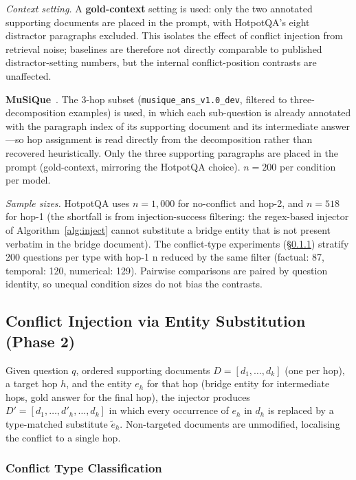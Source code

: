 \textit{Context setting.} A \textbf{gold-context} setting is used: only the two annotated supporting documents are placed in the prompt, with HotpotQA's eight distractor paragraphs excluded. This isolates the effect of conflict injection from retrieval noise; baselines are therefore not directly comparable to published distractor-setting numbers, but the internal conflict-position contrasts are unaffected.

\textbf{MuSiQue}~\citep{trivedi2022musique}. The 3-hop subset (\texttt{musique\_ans\_v1.0\_dev}, filtered to three-decomposition examples) is used, in which each sub-question is already annotated with the paragraph index of its supporting document and its intermediate answer---so hop assignment is read directly from the decomposition rather than recovered heuristically. Only the three supporting paragraphs are placed in the prompt (gold-context, mirroring the HotpotQA choice). $n = 200$ per condition per model.

\textit{Sample sizes.} HotpotQA uses $n = 1{,}000$ for no-conflict and hop-2, and $n = 518$ for hop-1 (the shortfall is from injection-success filtering: the regex-based injector of Algorithm~\ref{alg:inject} cannot substitute a bridge entity that is not present verbatim in the bridge document). The conflict-type experiments (\S\ref{sec:types}) stratify 200 questions per type with hop-1 n reduced by the same filter (factual: 87, temporal: 120, numerical: 129). Pairwise comparisons are paired by question identity, so unequal condition sizes do not bias the contrasts.

\subsection{Conflict Injection via Entity Substitution (Phase 2)}
\label{sec:injection}

Given question $q$, ordered supporting documents $D = [d_1, \ldots, d_k]$ (one per hop), a target hop $h$, and the entity $e_h$ for that hop (bridge entity for intermediate hops, gold answer for the final hop), the injector produces $D' = [d_1, \ldots, d'_h, \ldots, d_k]$ in which every occurrence of $e_h$ in $d_h$ is replaced by a type-matched substitute $\tilde{e}_h$. Non-targeted documents are unmodified, localising the conflict to a single hop.

\subsubsection{Conflict Type Classification}
\label{sec:types}

